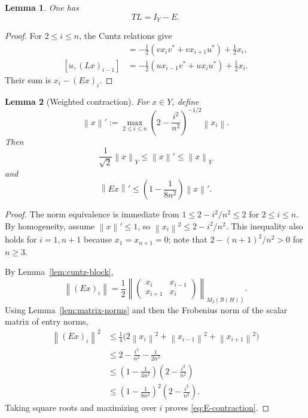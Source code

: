 \documentclass[11pt]{amsart}
\numberwithin{equation}{section}
\newtheorem{lemma}[lemma]{Lemma}
\theoremstyle{remark}
\newcommand{\norm}[1]{\left\lVert #1\right\rVert}
\begin{document}
\begin{lemma}\label{lem:TL}
One has
\begin{equation}\label{eq:TL}
 TL=I_Y-E.
\end{equation}
\end{lemma}

\begin{proof}
For $2\leq i\leq n$, the Cuntz relations give
\begin{align*}
 [v,(Lx)_i]
 &=-\frac12(vx_iv^*+vx_{i+1}u^*)+\frac12x_i,\\
 [u,(Lx)_{i-1}]
 &=-\frac12(ux_{i-1}v^*+ux_iu^*)+\frac12x_i.
\end{align*}
Their sum is $x_i-(Ex)_i$.
\end{proof}

\begin{lemma}[Weighted contraction]\label{lem:weighted-contraction}
For $x\in Y$, define
\begin{equation}\label{eq:prime-norm}
 \norm x'
 :=\max_{2\leq i\leq n}
 \left(2-\frac{i^2}{n^2}\right)^{-1/2}\norm{x_i}.
\end{equation}
Then
\begin{equation}\label{eq:norm-equivalence}
 \frac1{\sqrt2}\norm x_Y\leq\norm x'\leq\norm x_Y
\end{equation}
and
\begin{equation}\label{eq:E-contraction}
 \norm{Ex}'
 \leq\left(1-\frac1{8n^2}\right)\norm x'.
\end{equation}
\end{lemma}

\begin{proof}
The norm equivalence is immediate from
$1\leq2-i^2/n^2\leq2$ for $2\leq i\leq n$.
By homogeneity, assume $\norm x'\leq1$, so
$\norm{x_i}^2\leq2-i^2/n^2$.  This inequality also holds for $i=1,n+1$
because $x_1=x_{n+1}=0$; note that
$2-(n+1)^2/n^2>0$ for $n\geq3$.

By Lemma~\ref{lem:cuntz-block},
\begin{equation}\label{eq:E-block}
 \norm{(Ex)_i}
 =\frac12\norm{
 \begin{pmatrix}
 x_i&x_{i-1}\\x_{i+1}&x_i
 \end{pmatrix}}_{M_2(\mathcal B(H))}.
\end{equation}
Using Lemma~\ref{lem:matrix-norms} and then the Frobenius norm of the scalar matrix
of entry norms,
\begin{align*}
 \norm{(Ex)_i}^2
 &\leq\frac14\bigl(2\norm{x_i}^2+
 \norm{x_{i-1}}^2+\norm{x_{i+1}}^2\bigr)\\
 &\leq 2-\frac{i^2}{n^2}-\frac1{2n^2}\\
 &\leq\left(1-\frac1{4n^2}\right)
 \left(2-\frac{i^2}{n^2}\right)\\
 &\leq\left(1-\frac1{8n^2}\right)^2
 \left(2-\frac{i^2}{n^2}\right).
\end{align*}
Taking square roots and maximizing over $i$ proves
\eqref{eq:E-contraction}.
\end{proof}
\end{document}
